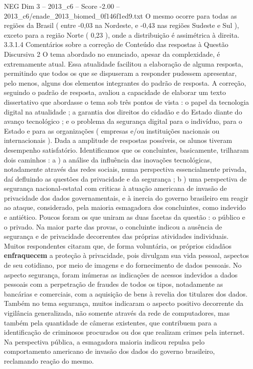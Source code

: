 \begin{textsample}{NEG Dim 3 – 2013\_c6 – Score -2.00 – 2013\_c6/enade\_2013\_biomed\_0f146f1ed9.txt}
O mesmo ocorre para todas as regiões da Brasil ( entre -0,03 na Nordeste, e -0,43 nas regiões Sudeste e Sul ), exceto para a região Norte ( 0,23 ), onde a distribuição é assimétrica à direita. 3.3.1.4 Comentários sobre a correção de Conteúdo das respostas à Questão Discursiva 2 O tema abordado no enunciado, apesar da complexidade, é extremamente atual.
Essa atualidade facilitou a elaboração de alguma resposta, permitindo que todos os que se dispuseram a responder pudessem apresentar, pelo menos, alguns dos elementos integrantes do padrão de resposta.
A correção, seguindo o padrão de resposta, avaliou a capacidade de elaborar um texto dissertativo que abordasse o tema sob três pontos de vista : o papel da tecnologia digital na atualidade ; a garantia dos direitos do cidadão e do Estado diante do avanço tecnológico ; e o problema da segurança digital para o indivíduo, para o Estado e para as organizações ( empresas e/ou instituições nacionais ou internacionais ).
Dada a amplitude de respostas possíveis, os alunos tiveram desempenho satisfatório.
Identificamos que os concluintes, basicamente, trilharam dois caminhos : a ) a análise da influência das inovações tecnológicas, notadamente através das redes sociais, numa perspectiva essencialmente privada, daí defluindo as questões da privacidade e da segurança ; b ) uma perspectiva de segurança nacional-estatal com criticas à atuação americana de invasão de privacidade dos dados governamentais, e à inercia do governo brasileiro em reagir ao ataque, considerado, pela maioria esmagadora dos concluintes, como indevido e antiético.
Poucos foram os que uniram as duas facetas da questão : o público e o privado.
Na maior parte das provas, o concluinte indicou a ausência de segurança e de privacidade decorrentes das próprias atividades individuais.
Muitos respondentes citaram que, de forma voluntária, os próprios cidadãos \textbf{enfraquecem} a proteção à privacidade, pois divulgam sua vida pessoal, aspectos de seu cotidiano, por meio de imagens e do fornecimento de dados pessoais.
No aspecto segurança, foram inúmeras as indicações de acessos indevidos a dados pessoais com a perpetração de fraudes de todos os tipos, notadamente as bancárias e comerciais, com a aquisição de bens à revelia dos titulares dos dados.
Também no tema segurança, muitos indicaram o aspecto positivo decorrente da vigilância generalizada, não somente através da rede de computadores, mas também pela quantidade de câmeras existentes, que contribuem para a identificação de criminosos procurados ou dos que realizam crimes pela internet.
Na perspectiva pública, a esmagadora maioria indicou repulsa pelo comportamento americano de invasão dos dados do governo brasileiro, reclamando reação do mesmo.

\end{textsample}
